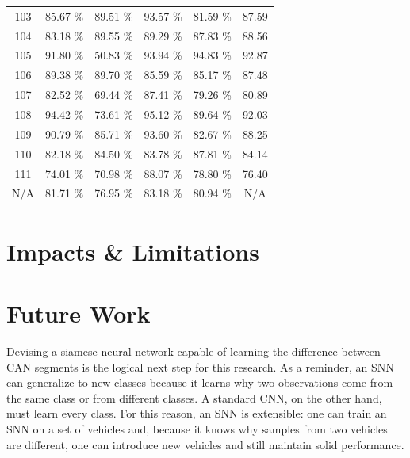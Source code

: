 \documentclass[10pt]{article}
\newcommand{\newpar}{\medskip \noindent}
\begin{document}
\begin{table}
\begin{tabular}{|c|c|c|c|c|c|}
    103 & 85.67 \% & 89.51 \% & \cellcolor{green}93.57 \% & \cellcolor{red}81.59 \% & 87.59 \\
    104 & \cellcolor{red}83.18 \% & \cellcolor{green}89.55 \% & 89.29 \% & 87.83 \% & 88.56 \\
    105 & 91.80 \% & \cellcolor{red}50.83 \% & 93.94 \% & \cellcolor{green}94.83 \% & 92.87 \\
    106 & 89.38 \% & \cellcolor{green}89.70 \% & 85.59 \% & \cellcolor{red}85.17 \% & 87.48 \\
    107 & 82.52 \% & \cellcolor{red}69.44 \% & \cellcolor{green}87.41 \% & 79.26 \% & 80.89 \\
    108 & 94.42 \% & \cellcolor{red}73.61 \% & \cellcolor{green}95.12 \% & 89.64 \% & 92.03 \\
    109 & 90.79 \% & 85.71 \% & \cellcolor{green}93.60 \% & \cellcolor{red}82.67 \% & 88.25 \\
    110 & \cellcolor{red}82.18 \% & 84.50 \% & 83.78 \% & \cellcolor{green}87.81 \% & 84.14 \\
    111 & 74.01 \% & \cellcolor{red}70.98 \% & \cellcolor{green}88.07 \% & 78.80 \% & 76.40 \\
    \hline
    N/A & 81.71 \% & 76.95 \% & 83.18 \% & 80.94 \% & N/A \\
    \hline
    \end{tabular}
\end{table}

\section{Impacts \& Limitations}


\section{Future Work}

\newpar Devising a siamese neural network capable of learning the difference between CAN segments is the logical next step for this research. As a reminder, an SNN can generalize to new classes because it learns why two observations come from the same class or from different classes. A standard CNN, on the other hand, must learn every class. For this reason, an SNN is extensible: one can train an SNN on a set of vehicles and, because it knows why samples from two vehicles are different, one can introduce new vehicles and still maintain solid performance.
\end{document}
